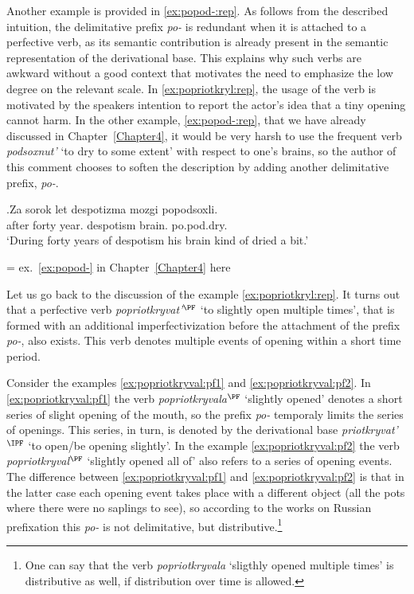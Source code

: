 Another example is provided in \ref{ex:popod-:rep}. As follows from the described intuition, the delimitative prefix \textit{po-} is redundant when it is attached to a perfective verb, as its semantic contribution is already present in the semantic representation of the derivational base. This explains why such verbs are awkward without a good context that motivates the need to emphasize the low degree on the relevant scale. In \ref{ex:popriotkryl:rep}, the usage of the verb is motivated by the speakers intention to report the actor's idea that a tiny opening cannot harm. In the other example, \ref{ex:popod-:rep}, that we have already discussed in Chapter~\ref{Chapter4}, it would be very harsh to use the frequent verb \textit{podsoxnut'} `to dry to some extent' with respect to one's brains, so the author of this comment chooses to soften the description by adding another delimitative prefix, \textit{po-}. 

\exg.\label{ex:popod-:rep}Za sorok let despotizma mozgi popodsoxli.\\
after forty year. despotism brain. po.pod.dry.\\
\vspace{0.5em}
`During forty years of despotism his brain kind of dried a bit.'
\begin{flushright}
\vspace{-0.5em}
= ex.~\ref{ex:popod-} in Chapter~\ref{Chapter4} here
\end{flushright}

Let us go back to the discussion of the example \ref{ex:popriotkryl:rep}. It turns out that a perfective verb \textit{popriotkryvat'}$^{\PF}$ `to slightly open multiple times', that is formed with an additional imperfectivization before the attachment of the prefix \textit{po-}, also exists. This verb denotes multiple events of opening within a short time period. 

Consider the examples \ref{ex:popriotkryval:pf1} and \ref{ex:popriotkryval:pf2}. In \ref{ex:popriotkryval:pf1} the verb \textit{popriotkryvala$^{\PF}$} `slightly opened' denotes a short series of slight opening of the mouth, so the prefix \textit{po-} temporaly limits the series of openings. This series, in turn, is denoted by the derivational base \textit{priotkryvat'$^{\IPF}$} `to open/be opening slightly'. In the example \ref{ex:popriotkryval:pf2} the verb  \textit{popriotkryval$^{\PF}$} `slightly opened all of' also refers to a series of opening events. The difference between \ref{ex:popriotkryval:pf1} and \ref{ex:popriotkryval:pf2} is that in the latter case each opening event takes place with a different object (all the pots where there were no saplings to see), so according to the works on Russian prefixation this \textit{po-} is not delimitative, but distributive.\footnote{One can say that the verb \textit{popriotkryvala} `sligthly opened multiple times' is distributive as well, if distribution over time is allowed.}

